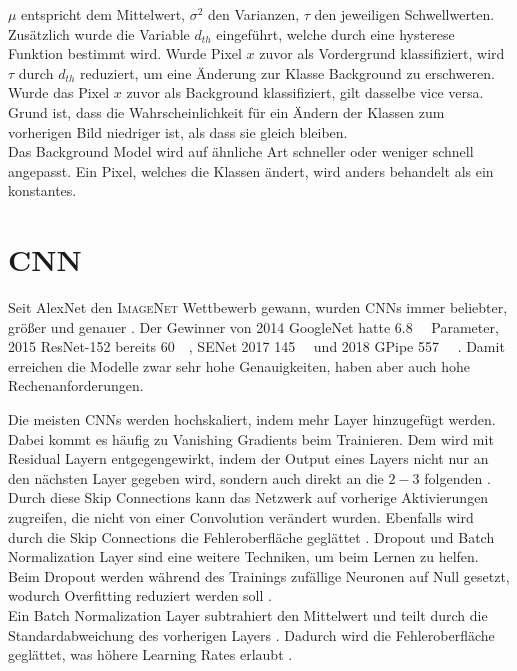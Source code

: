 $\mu$ entspricht dem Mittelwert, $\sigma^2$ den Varianzen, $\tau$ den jeweiligen Schwellwerten. \\
Zusätzlich wurde die Variable $d_{th}$ eingeführt, welche durch eine \gls{hysterese} Funktion bestimmt wird.
Wurde Pixel $x$ zuvor als Vordergrund klassifiziert, wird $\tau$ durch $d_{th}$ reduziert, um eine Änderung zur Klasse Background zu erschweren.
Wurde das Pixel $x$ zuvor als Background klassifiziert, gilt dasselbe vice versa.
Grund ist, dass die Wahrscheinlichkeit für ein Ändern der Klassen zum vorherigen Bild niedriger ist, als dass sie gleich bleiben. \\
Das Background Model wird auf ähnliche Art schneller oder weniger schnell angepasst.
Ein Pixel, welches die Klassen ändert, wird anders behandelt als ein konstantes.

\section{CNN}
Seit AlexNet  den \textsc{ImageNet} Wettbewerb gewann, wurden \acp{CNN} immer beliebter, größer und genauer \cite{krizhevsky_imagenet_2012,russakovsky_imagenet_2015}.
Der Gewinner von 2014 GoogleNet hatte \SI{6.8}{\mega\relax} Parameter, 2015 ResNet-152 bereits \SI{60}{\mega\relax}, SENet 2017 \SI{145}{\mega\relax} und 2018 GPipe \SI{557}{\mega\relax} \cite{szegedy_going_2014, he_deep_2015, hu_squeeze-and-excitation_2018, huang_gpipe:_2019}.
Damit erreichen die Modelle zwar sehr hohe Genauigkeiten, haben aber auch hohe Rechenanforderungen.

Die meisten \acp{CNN} werden hochskaliert, indem mehr Layer hinzugefügt werden.
Dabei kommt es häufig zu Vanishing Gradients beim Trainieren.
Dem wird mit Residual Layern entgegengewirkt, indem der Output eines Layers nicht nur an den nächsten Layer gegeben wird, sondern auch direkt an die $2-3$ folgenden \cite{he_deep_2015}. 
Durch diese Skip Connections kann das Netzwerk auf vorherige Aktivierungen zugreifen, die nicht von einer Convolution verändert wurden.
Ebenfalls wird durch die Skip Connections die Fehlerober\-fläche geglättet \cite{li_visualizing_2018}.
Dropout und Batch Normalization Layer sind eine weitere Techniken, um beim Lernen zu helfen.
Beim Dropout werden während des Trainings zufällige Neuronen auf Null gesetzt, wodurch  Overfitting reduziert werden soll \cite{srivastava_dropout_2014}. \\
Ein Batch Normalization Layer subtrahiert den Mittelwert und teilt durch die Standardabweichung des vorherigen Layers \cite{ioffe_batch_2015}. Dadurch wird die Fehler\-oberfläche geglättet, was höhere Learning Rates erlaubt \cite{santurkar_how_2019}.

